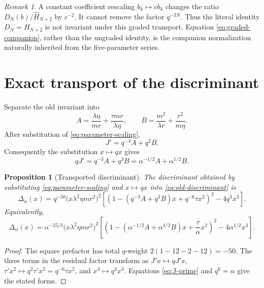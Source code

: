 \documentclass[11pt]{article}
\newtheorem{proposition}[theorem]{Proposition}
\theoremstyle{definition}
\theoremstyle{remark}
\newtheorem{remark}[theorem]{Remark}
\newcommand{\Ha}{\widehat H}
\begin{document}
\begin{remark}
A constant coefficient rescaling $b_k\mapsto cb_k$ changes the ratio
$D_N(b)/\Ha_{N+2}$ by $c^{-2}$.  It cannot remove the factor $q^{-3N}$.
Thus the literal identity $D_N=H_{N+2}$ is not invariant under this graded
transport.  Equation \eqref{eq:graded-companion}, rather than the ungraded
identity, is the companion normalization naturally inherited from the
five-parameter series.
\end{remark}

\section{Exact transport of the discriminant}
Separate the old invariant into
\begin{equation}
 A=\frac{\lambda\eta}{mr}+\frac{\tau mr}{\lambda\eta},
 \qquad
 B=\frac{m^2}{\lambda r}+\frac{r^2}{m\eta}.
 \label{eq:A-B}
\end{equation}
After substitution of \eqref{eq:parameter-scaling},
\begin{equation}
 J'=q^{-4}A+q^2B.
 \label{eq:J-prime}
\end{equation}
Consequently the substitution $x\mapsto qx$ gives
\begin{equation}
 qJ'=q^{-3}A+q^3B
 =\alpha^{-1/2}A+\alpha^{1/2}B.
 \label{eq:J-alpha}
\end{equation}

\begin{proposition}[Transported discriminant]
The discriminant obtained by substituting
\eqref{eq:parameter-scaling} and $x\mapsto qx$ into
\eqref{eq:old-discriminant} is
\begin{equation}
 \Delta_\alpha(x)
 =q^{-50}\bigl(x\lambda^2\eta m r^2\bigr)^2
 \left[
  \left(1-(q^{-3}A+q^3B)x+q^{-6}\tau x^2\right)^2
  -4q^3x^3
 \right].
 \label{eq:q-discriminant}
\end{equation}
Equivalently,
\begin{equation}
 \Delta_\alpha(x)
 =\alpha^{-25/3}\bigl(x\lambda^2\eta m r^2\bigr)^2
 \left[
  \left(1-(\alpha^{-1/2}A+\alpha^{1/2}B)x
             +\frac{\tau}{\alpha}x^2\right)^2
  -4\alpha^{1/2}x^3
 \right].
 \label{eq:alpha-discriminant}
\end{equation}
\end{proposition}
\begin{proof}
The square prefactor has total $q$-weight
$2(1-12-2-12)=-50$.  The three terms in the residual factor transform as
$J'x\mapsto qJ'x$, $\tau'x^2\mapsto q^2\tau'x^2=q^{-6}\tau x^2$, and
$x^3\mapsto q^3x^3$.  Equations \eqref{eq:J-prime} and $q^6=\alpha$ give the
stated forms.
\end{proof}
\end{document}
